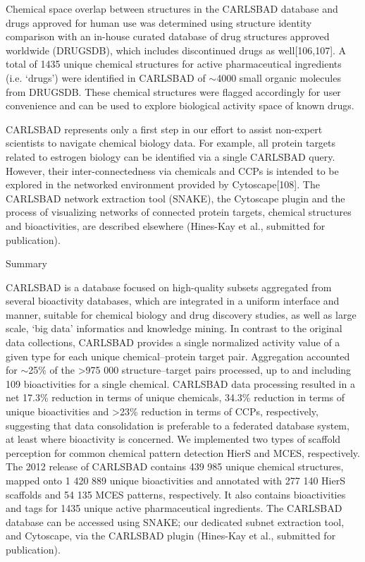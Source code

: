 Chemical space overlap between structures in the CARLSBAD database and drugs approved for human use was determined using structure identity comparison with an in-house curated database of drug structures approved worldwide (DRUGSDB), which includes discontinued drugs as well[106,107]. A total of 1435 unique chemical structures for active pharmaceutical ingredients (i.e. ‘drugs’) were identified in CARLSBAD of $\sim$4000 small organic molecules from DRUGSDB. These chemical structures were flagged accordingly for user convenience and can be used to explore biological activity space of known drugs.

CARLSBAD represents only a first step in our effort to assist non-expert scientists to navigate chemical biology data. For example, all protein targets related to estrogen biology can be identified via a single CARLSBAD query. However, their inter-connectedness via chemicals and CCPs is intended to be explored in the networked environment provided by Cytoscape[108]. The CARLSBAD network extraction tool (SNAKE), the Cytoscape plugin and the process of visualizing networks of connected protein targets, chemical structures and bioactivities, are described elsewhere (Hines-Kay et al., submitted for publication).

Summary

CARLSBAD is a database focused on high-quality subsets aggregated from several bioactivity databases, which are integrated in a uniform interface and manner, suitable for chemical biology and drug discovery studies, as well as large scale, ‘big data’ informatics and knowledge mining. In contrast to the original data collections, CARLSBAD provides a single normalized activity value of a given type for each unique chemical–protein target pair. Aggregation accounted for $\sim$25\% of the >975 000 structure–target pairs processed, up to and including 109 bioactivities for a single chemical. CARLSBAD data processing resulted in a net 17.3\% reduction in terms of unique chemicals, 34.3\% reduction in terms of unique bioactivities and >23\% reduction in terms of CCPs, respectively, suggesting that data consolidation is preferable to a federated database system, at least where bioactivity is concerned. We implemented two types of scaffold perception for common chemical pattern detection HierS and MCES, respectively. The 2012 release of CARLSBAD contains 439 985 unique chemical structures, mapped onto 1 420 889 unique bioactivities and annotated with 277 140 HierS scaffolds and 54 135 MCES patterns, respectively. It also contains bioactivities and tags for 1435 unique active pharmaceutical ingredients. The CARLSBAD database can be accessed using SNAKE; our dedicated subnet extraction tool, and Cytoscape, via the CARLSBAD plugin (Hines-Kay et al., submitted for publication).




